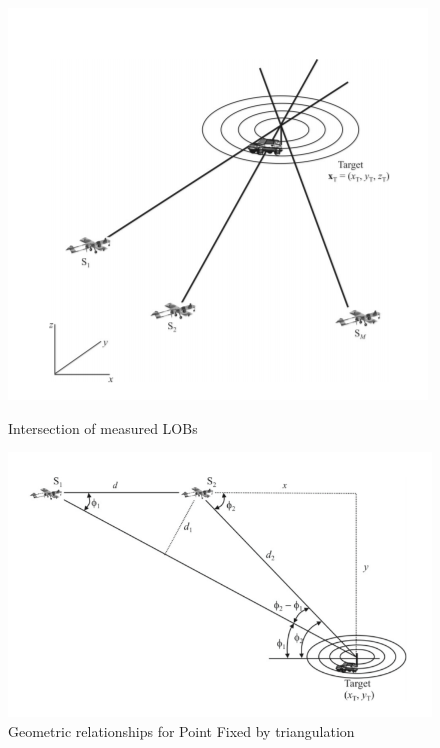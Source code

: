 \documentclass[english,purist]{ist-report}
\begin{document}
\begin{figure}[ht]
    \begin{minipage}[b]{0.49\textwidth}
        \captionsetup{width = 0.9\linewidth}
        \centering
        \includegraphics[width=\linewidth]{target1.png}
        \caption{Intersection of measured LOBs}
        \label{target1}
    \end{minipage}
    \begin{minipage}[b]{0.49\textwidth}
        \captionsetup{width = 0.9\linewidth}
        \centering
        \includegraphics[width=\linewidth]{target4.png}
        \caption{Geometric relationships for Point Fixed by triangulation}
        \label{target4}
    \end{minipage}
\end{figure}
\end{document}
